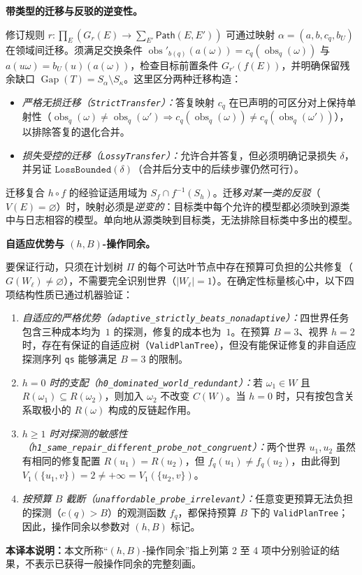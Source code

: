 \documentclass[11pt,a4paper]{article}
\theoremstyle{preprintthm}
\theoremstyle{preprintdef}
\newcommand{\obs}{\operatorname{obs}}
\newcommand{\Gap}{\operatorname{Gap}}
\newcommand{\subheading}[1]{\par\addvspace{8pt}\noindent\textbf{#1}\par\nobreak}
\begin{document}
\subheading{带类型的迁移与反驳的逆变性。}
修订规则 $r:\prod_E (G_r(E)\to\sum_{E'}\mathsf{Path}(E,E'))$ 可通过映射 $\alpha=(a,b,c_q,b_U)$ 在领域间迁移。须满足交换条件 $\obs'_{b(q)}(a(\omega))=c_q(\obs_q(\omega))$ 与 $a(u\omega)=b_U(u)(a(\omega))$，检查目标前置条件 $G_{r'}(f(E))$，并明确保留残余缺口 $\Gap(T)=S_\alpha\setminus S_\kappa$。这里区分两种迁移构造：
\begin{itemize}
  \item \emph{严格无损迁移（\texttt{StrictTransfer}）：}答复映射 $c_q$ 在已声明的可区分对上保持单射性（$\obs_q(\omega)\ne\obs_q(\omega')\Rightarrow c_q(\obs_q(\omega))\ne c_q(\obs_q(\omega'))$），以排除答复的退化合并。
  \item \emph{损失受控的迁移（\texttt{LossyTransfer}）：}允许合并答复，但必须明确记录损失 $\delta$，并另证 $\texttt{LossBounded}(\delta)$（合并后分支中的后续步骤仍然可行）。
\end{itemize}
迁移复合 $h\circ f$ 的经验证适用域为 $S_f\cap f^{-1}(S_h)$。迁移\emph{对某一类的反驳}（$V(E)=\varnothing$）时，映射必须是\emph{逆变的}：目标类中每个允许的模型都必须映到源类中与日志相容的模型。单向地从源类映到目标类，无法排除目标类中多出的模型。

\subheading{自适应优势与 $(h,B)$-操作同余。}
要保证行动，只须在计划树 $\Pi$ 的每个可达叶节点中存在预算可负担的公共修复（$G(W_\ell)\ne\varnothing$），不需要完全识别世界（$|W_\ell|=1$）。在确定性标量核心中，以下四项结构性质已通过机器验证：
\begin{enumerate}
  \item \emph{自适应的严格优势（\texttt{adaptive\_\allowbreak strictly\_\allowbreak beats\_\allowbreak nonadaptive}）：}四世界任务包含三种成本均为~$1$ 的探测，修复的成本也为~$1$。在预算 $B=3$、视界 $h=2$ 时，存在有保证的自适应树（\texttt{ValidPlanTree}），但没有能保证修复的非自适应探测序列 \texttt{qs} 能够满足 $B=3$ 的限制。
  \item \emph{$h=0$ 时的支配（\texttt{h0\_dominated\_world\_redundant}）：}若 $\omega_1\in W$ 且 $R(\omega_1)\subseteq R(\omega_2)$，则加入 $\omega_2$ 不改变 $C(W)$。当 $h=0$ 时，只有按包含关系取极小的 $R(\omega)$ 构成的反链起作用。
  \item \emph{$h\ge1$ 时对探测的敏感性（\texttt{h1\_\allowbreak same\_\allowbreak repair\_\allowbreak different\_\allowbreak probe\_\allowbreak not\_\allowbreak congruent}）：}两个世界 $u_1,u_2$ 虽然有相同的修复配置 $R(u_1)=R(u_2)$，但 $f_q(u_1)\ne f_q(u_2)$，由此得到 $V_1(\{u_1,v\})=2\ne+\infty=V_1(\{u_2,v\})$。
  \item \emph{按预算 $B$ 截断（\texttt{unaffordable\_probe\_irrelevant}）：}任意变更预算无法负担的探测（$c(q)>B$）的观测函数 $f_q$，都保持预算 $B$ 下的 \texttt{ValidPlanTree}；因此，操作同余以参数对 $(h,B)$ 标记。
\end{enumerate}
\noindent\textbf{本译本说明：}本文所称“$(h,B)$-操作同余”指上列第 2 至 4 项中分别验证的结果，不表示已获得一般操作同余的完整刻画。
\end{document}
